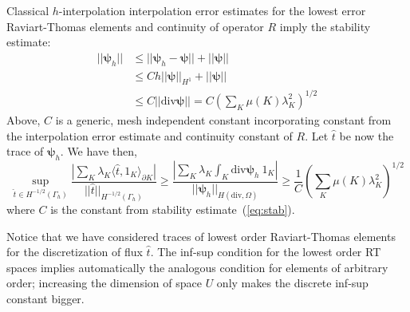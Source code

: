\documentclass[letterpaper]{article}
\newcommand{\ptl}{{\partial}}
\newcommand{\bfpsi}{\boldsymbol\psi}
\begin{document}
Classical $h$-interpolation interpolation error estimates for the lowest error
Raviart-Thomas elements and continuity of operator $R$ imply the stability estimate:
\begin{equation}
\begin{array}{lll}
|| \bfpsi_h || & \leq || \bfpsi_h - \bfpsi || + || \bfpsi ||\\[8pt]
&\leq C h || \bfpsi ||_{H^1} +  || \bfpsi || \\[8pt]
& \leq C || \text{div} \bfpsi || = C (\sum_K \mu(K) \lambda_K^2)^{1/2}
\end{array}
\label{eq:stab}
\end{equation}
Above, $C$ is a generic, mesh independent constant incorporating constant from
the interpolation error estimate and continuity constant of $R$.
Let $\hat{t}$ be now the trace of $\bfpsi_h$. We have then,
\begin{equation}
\sup_{\hat{t} \in H^{-1/2}(\Gamma_h)} \frac{|  \sum_K \lambda_K \langle
\hat{t},1_K \rangle_{\ptl K} |}{|| \hat{t} ||_{H^{-1/2}(\Gamma_h)}}
\geq \frac{| \sum_K \lambda_K \int_K \text{div} \bfpsi_h \: 1_K  |}
{|| \bfpsi_h ||_{H(\text{div},\Omega)}}
\geq \frac{1}{C} (\sum_K \mu(K) \lambda_K^2)^{1/2}
\end{equation}
where $C$ is the constant from stability estimate~(\ref{eq:stab}).

Notice that we have considered traces of lowest order Raviart-Thomas elements
for the discretization of flux $\hat{t}$. The inf-sup condition for the lowest
order RT spaces implies automatically the analogous condition for elements of
arbitrary order; increasing the dimension of space $U$ only makes the discrete
inf-sup constant bigger.
\end{document}
